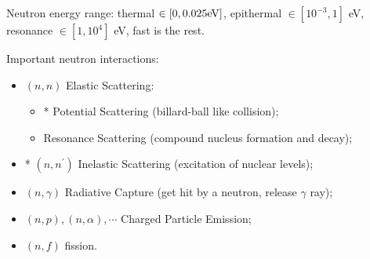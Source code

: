 \documentclass{school-22.101-notes}
\begin{document}
\clearpage
Neutron energy range: thermal $\in [0, 0.025 \mathrm{eV}]$, epithermal $\in [10^{-3}, 1]$ eV, resonance $\in [1, 10^4]$ eV, fast is the rest. 

Important neutron interactions:
    \begin{itemize}
    \item $(n,n)$ Elastic Scattering: 
        \begin{itemize}
        \item* Potential Scattering (billard-ball like collision);
        \item Resonance Scattering (compound nucleus formation and decay);
        \end{itemize}
    \item* $(n,n^{\prime})$ Inelastic Scattering (excitation of nuclear levels);
    \item $(n, \gamma)$ Radiative Capture (get hit by a neutron, release $\gamma$ ray);
    \item $(n, p), (n,\alpha), \cdots$ Charged Particle Emission;
    \item $(n, f)$ fission.     
    \end{itemize}
\end{document}

